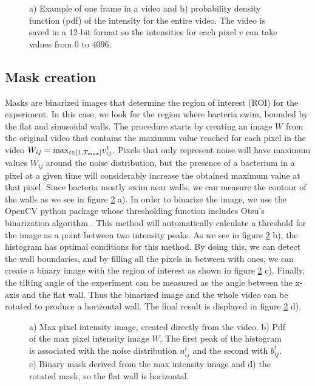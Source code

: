 \begin{figure}[H]
	\centering
	
	\caption[Typical video frame]{a) Example of one frame in a video and b) probability density function (pdf) of the intensity for the entire video. The video is saved in a 12-bit format so the intensities for each pixel $v$ can take values from $0$ to $4096$. }
	\label{video_histogram}
\end{figure}

\subsection{Mask creation}

Masks are binarized images that determine the region of interest (ROI) for the experiment. In this case,  we look for the region where bacteria swim, bounded by the flat and sinusoidal walls. The procedure starts by creating an image $W$ from the original video that contains the maximum value reached for each pixel in the video $W_{ij}={\rm max}_{t\in[1,T_{max}]} v_{ij}^t$. Pixels that only represent noise will have maximum values $W_{ij}$ around the noise distribution, but the presence of a bacterium in a pixel at a given time will considerably increase the obtained maximum value at that pixel. Since bacteria mostly swim near walls, we can measure the contour of the walls as we see in figure \ref{mask} a). In order to binarize the image, we use the OpenCV python package whose thresholding function includes Otsu's binarization algorithm \cite{Grdiet2013BinarizationABSTARCT}. This method will automatically calculate a threshold for the image as a point between two intensity peaks. As we see in figure \ref{mask} b), the histogram has optimal conditions for this method. By doing this, we can detect the wall boundaries, and by filling all the pixels in between with ones, we can create a binary image with the region of interest as shown in figure \ref{mask} c). Finally, the tilting angle of the experiment can be measured as the angle between the x-axis and the flat wall. Thus the binarized image and the whole video can be rotated to produce a horizontal wall. The final result is displayed in figure \ref{mask} d). 

\begin{figure}[H]
	\centering
	
	\caption[Mask example]{a) Max pixel intensity image, created directly from the video. b) Pdf of the max pixel intensity image $W$. The first peak of the histogram is associated with the noise distribution $n_{ij}^t$ and the second with $b_{ij}^t$. c) Binary mask derived from the max intensity image and d) the rotated mask, so the flat wall is horizontal. }
	\label{mask}
\end{figure}

